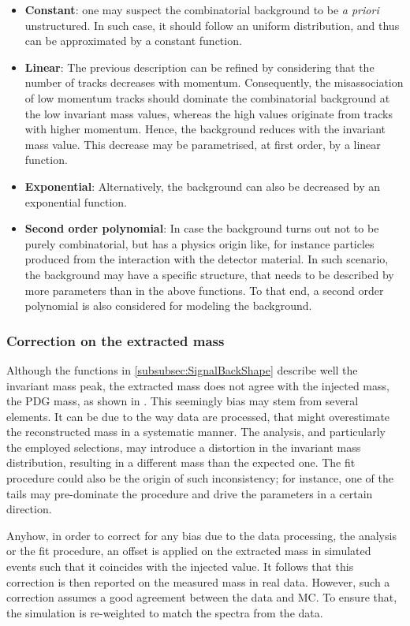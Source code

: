 \begin{itemize}
\item \textbf{Constant}: one may suspect the combinatorial background to be \textit{a priori} unstructured. In such case, it should follow an uniform distribution, and thus can be approximated by a constant function.
\item \textbf{Linear}: The previous description can be refined by considering that the number of tracks decreases with momentum. Consequently, the misassociation of low momentum tracks should dominate the combinatorial background at the low invariant mass values, whereas the high values originate from tracks with higher momentum. Hence, the background reduces with the invariant mass value. This decrease may be parametrised, at first order, by a linear function.
\item \textbf{Exponential}: Alternatively, the background can also be decreased by an exponential function.
\item \textbf{Second order polynomial}: In case the background turns out not to be purely combinatorial, but has a physics origin like, for instance particles produced from the interaction with the detector material. In such scenario, the background may have a specific structure, that needs to be described by more parameters than in the above functions. To that end, a second order polynomial is also considered for modeling the background.
\end{itemize}

\subsubsection{Correction on the extracted mass}
\label{subsubsec:CorrectionOnTheExtractedMass}

Although the functions in \Sec\ref{subsubsec:SignalBackShape} describe well the invariant mass peak, the extracted mass does not agree with the injected mass, the PDG mass, as shown in \fig. This seemingly bias may stem from several elements. It can be due to the way data are processed, that might overestimate the reconstructed mass in a systematic manner. The analysis, and particularly the employed selections, may introduce a distortion in the invariant mass distribution, resulting in a different mass than the expected one. The fit procedure could also be the origin of such inconsistency; for instance, one of the tails may pre-dominate the procedure and drive the parameters in a certain direction.

Anyhow, in order to correct for any bias due to the data processing, the analysis or the fit procedure, an offset is applied on the extracted mass in simulated events such that it coincides with the injected value. It follows that this correction is then reported on the measured mass in real data. However, such a correction assumes a good agreement between the data and MC. To ensure that, the simulation is re-weighted to match the \pT spectra from the data.

